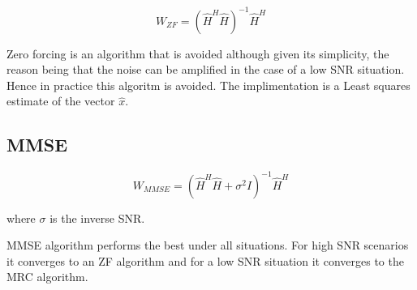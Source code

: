 \begin{equation}
    W_{ZF} = (\hat{H}^H\hat{H})^{-1}\hat{H}^H
\end{equation}

Zero forcing is an algorithm that is avoided although given its simplicity, the reason being that the noise can be amplified in the case of a low SNR situation. Hence in practice this algoritm is avoided. The implimentation is a Least squares estimate of the vector $\hat{x}$.

\subsection{MMSE}\label{ssec:MMSE}

\begin{equation}
    W_{MMSE} = (\hat{H}^H\hat{H}+\sigma^{2}I)^{-1}\hat{H}^H
\end{equation}

where $\sigma$ is the inverse SNR.

MMSE algorithm performs the best under all situations. For high SNR scenarios it converges to an ZF algorithm and for a low SNR situation it converges to the MRC algorithm.

%

